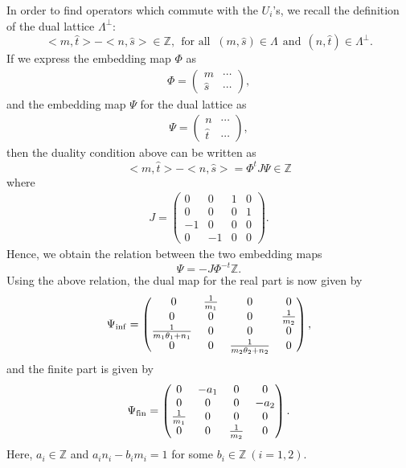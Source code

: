 \documentclass[12pt, a4paper]{article}
\newcommand{\Z}{{\mathbb Z}}
\begin{document}


In order to find operators which commute with the $U_i$'s, we
recall the definition of the dual lattice $ \Lambda^\perp $:
\[ <m, \hat t>-<n, \hat s> \in{\Z}, \ \
 \text{for all } \ (m,\hat s)\in \Lambda \ \ \text{and} \ \
 (n,\hat t)\in  \Lambda^\perp . \]
If we express the embedding map $\Phi$ as
\begin{align}\label{Tmap}
\Phi=\begin{pmatrix} m& \cdots \\
                \hat s & \cdots \end{pmatrix},
\end{align}
and the embedding map $\Psi$ for the dual lattice as
\begin{align}\label{Smap}
 \Psi=\begin{pmatrix} n& \cdots \\
                \hat t & \cdots \end{pmatrix} ,
\end{align}
then the duality condition above can be written as
\[ <m,\hat t> - < n,\hat s> = \Phi^t J \Psi \in \Z \]
where
\begin{align}\label{Jdef}
J=\begin{pmatrix} 0&0&1&0\\
                0&0&0&1\\
                -1&0&0&0\\
                0&-1&0&0\end{pmatrix}.
\end{align}
Hence, we obtain the relation between the two embedding maps
\begin{equation} \label{maprel}
\Psi = -J \Phi^{-t} \Z .
\end{equation}
%
%
 Using the above relation, the dual map for the real part is now given by
\begin{align}\label{rpsi}
\Psi_{\rm inf}=\begin{pmatrix}\ 0 &  \frac{1}{m_1} &0&0\\
                0&0&0& \frac{1}{m_2}\\
                \frac{1}{m_1 \theta_1 + n_1}&0&0&0\\
                0&0&  \frac{1}{m_2 \theta_2 + n_2}&0\end{pmatrix},
\end{align}
and the finite part is given by
\begin{align}\label{fpsi}
\Psi_{\rm fin}=\begin{pmatrix} 0&-a_1&0&0\\
                0&0&0&-a_2\\
                \frac{1}{m_1}&0&0&0\\
                0&0&  \frac{1}{m_2}&0 \end{pmatrix} .
\end{align}
Here, $a_i \in \Z$ and $a_i n_i -b_i m_i  = 1$ for some $b_i \in
\Z \ (i=1,2)$.
\end{document}
